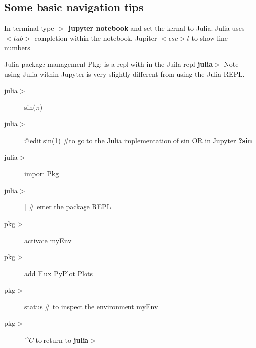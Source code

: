 \subsection{Some basic navigation tips}
In terminal type {\bf $>$ jupyter notebook}  and set the kernal to Julia. Julia uses $<tab>$ completion within the notebook. Jupiter $<esc>l$  to show line numbers

Julia  package management Pkg:  is a repl with in the  Juila repl {\bf julia$>$}
Note using Julia within Jupyter is very slightly different from using the Julia REPL.

 \begin{description}
 \item[julia$>$] sin($\pi$)
 
 \item[julia$>$] @edit sin(1)  \#to go to the Julia implementation of sin OR in Jupyter {\bf ?sin}
 \item[julia$>$] import Pkg
 \item[julia$>$] ]   \# enter the package REPL
 \item [pkg$>$] activate  myEnv
 \item [pkg$>$]  add Flux PyPlot Plots
 \item [pkg$>$]  status \# to inspect the environment myEnv
 \item [pkg$>$]  \emph{\textasciicircum C} to return to {\bf julia$>$}
\end{description} 

